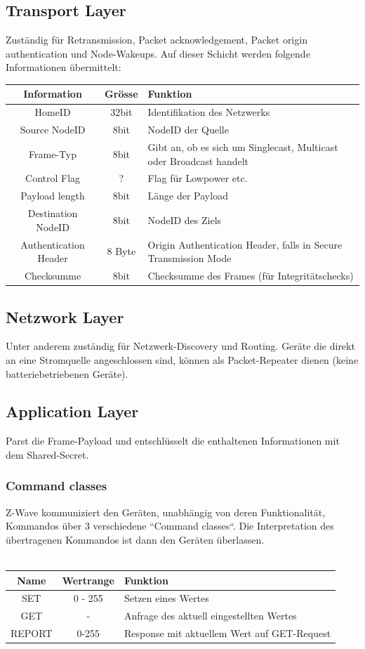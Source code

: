 \documentclass[a4paper,11pt]{article}
\begin{document}
\subsection*{Transport Layer}
Zuständig für Retransmission, Packet acknowledgement, Packet origin authentication und Node-Wakeups. Auf dieser Schicht werden folgende Informationen übermittelt:\\
\begin{tabular}{| c | c | p{10cm} |}
	\hline
	\textbf{Information} & \textbf{Grösse}& \textbf{Funktion}\\\hline
	HomeID & 32bit & Identifikation des Netzwerks \\\hline
	Source NodeID & 8bit & NodeID der Quelle \\\hline
	Frame-Typ & 8bit & Gibt an, ob es sich um Singlecast, Multicast oder Broadcast handelt\\\hline
	Control Flag & ? & Flag für Lowpower etc.\\\hline
	Payload length & 8bit & Länge der Payload\\\hline
	Destination NodeID & 8bit & NodeID des Ziels \\\hline
	Authentication Header & 8 Byte & Origin Authentication Header, falls in Secure Transmission Mode\\\hline
	Checksumme & 8bit & Checksumme des Frames (für Integritätschecks)\\\hline
\end{tabular}

\subsection*{Netzwork Layer}
Unter anderem zuständig für Netzwerk-Discovery und Routing. Geräte die direkt an eine Stromquelle angeschlossen sind, können als Packet-Repeater dienen (keine batteriebetriebenen Geräte).

\subsection*{Application Layer}
Parst die Frame-Payload und entschlüsselt die enthaltenen Informationen mit dem Shared-Secret.

\subsubsection*{Command classes}
Z-Wave kommuniziert den Geräten, unabhängig von deren Funktionalität, Kommandos über 3 verschiedene ``Command classes``. Die Interpretation des übertragenen Kommandos ist dann den Geräten überlassen.\\\\
\begin{tabular}{| c | c | p{6cm} |}
	\hline
	\textbf{Name} & \textbf{Wertrange}& \textbf{Funktion}\\\hline
	SET & 0 - 255 & Setzen eines Wertes \\\hline
	GET & - & Anfrage des aktuell eingestellten Wertes \\\hline
	REPORT & 0-255 & Response mit aktuellem Wert auf GET-Request\\\hline
\end{tabular}
~
\newpage
\end{document}
